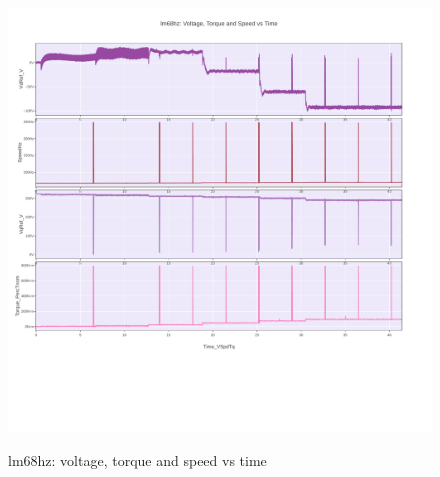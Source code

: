 \documentclass[paper=a4, fontsize=11pt]{scrartcl} %
\numberwithin{equation}{section} %
\numberwithin{figure}{section} %
\numberwithin{table}{section} %
\begin{document}
  \begin{figure}[H]
    \centering
      \href{https://plot.ly/~versag/44/#/}{\includegraphics[width=1\linewidth]{lm68hz_voltage_torque_speed_vs_time}}
        \caption{lm68hz: voltage, torque and speed vs time}
  \end{figure}
\end{document}
